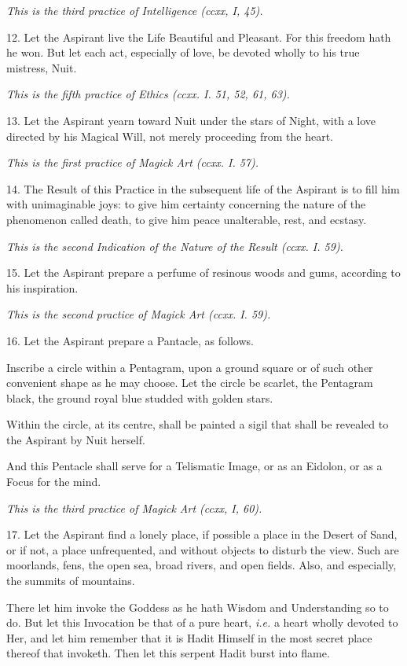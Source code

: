 \textit{This is the third practice of Intelligence (ccxx, I, 45).}

12. Let the Aspirant live the Life Beautiful and Pleasant. For this freedom hath he won. But let each act, especially of love, be devoted wholly to his true mistress, Nuit.

\textit{This is the fifth practice of Ethics (ccxx. I. 51, 52, 61, 63).}

13. Let the Aspirant yearn toward Nuit under the stars of Night, with a love directed by his Magical Will, not merely proceeding from the heart.

\textit{This is the first practice of Magick Art (ccxx. I. 57).}

14. The Result of this Practice in the subsequent life of the Aspirant is to fill him with unimaginable joys: to give him certainty concerning the nature of the phenomenon called death, to give him peace unalterable, rest, and ecstasy.

\textit{This is the second Indication of the Nature of the Result (ccxx. I. 59).}

15. Let the Aspirant prepare a perfume of resinous woods and gums, according to his inspiration.

\textit{This is the second practice of Magick Art (ccxx. I. 59).}

16. Let the Aspirant prepare a Pantacle, as follows.

Inscribe a circle within a Pentagram, upon a ground square or of such other convenient shape as he may choose. Let the circle be scarlet, the Pentagram black, the ground royal blue studded with golden stars.

Within the circle, at its centre, shall be painted a sigil that shall be revealed to the Aspirant by Nuit herself.

And this Pentacle shall serve for a Telismatic Image, or as an Eidolon, or as a Focus for the mind.

\textit{This is the third practice of Magick Art (ccxx, I, 60).}

17. Let the Aspirant find a lonely place, if possible a place in the Desert of Sand, or if not, a place unfrequented, and without objects to disturb the view. Such are moorlands, fens, the open sea, broad rivers, and open fields. Also, and especially, the summits of mountains.

There let him invoke the Goddess as he hath Wisdom and Understanding so to do. But let this Invocation be that of a pure heart, \textit{i.e.} a heart wholly devoted to Her, and let him remember that it is Hadit Himself in the most secret place thereof that invoketh. Then let this serpent Hadit burst into flame.

